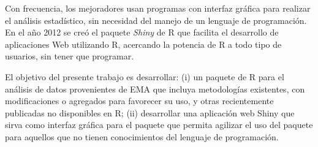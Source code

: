 Con frecuencia, los mejoradores usan programas con interfaz gráfica para realizar el análisis estadístico, sin necesidad del manejo de un lenguaje de programación. En el año 2012 se creó el paquete \emph{Shiny} de R que facilita el desarrollo de aplicaciones Web utilizando R, acercando la potencia de R a todo tipo de usuarios, sin tener que programar.

El objetivo del presente trabajo es desarrollar: (i) un paquete de R para el análisis de datos provenientes de EMA que incluya metodologías existentes, con modificaciones o agregados para favorecer su uso, y otras recientemente publicadas no disponibles en R; (ii) desarrollar una aplicación web Shiny que sirva como interfaz gráfica para el paquete que permita agilizar el uso del paquete para aquellos que no tienen conocimientos del lenguaje de programación.
